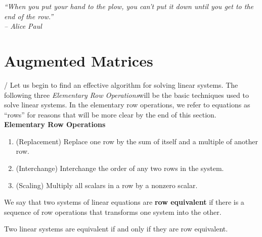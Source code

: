 \begin{center} 
\emph{``When you put your hand to the plow, you can't put it down until you get to the end of the row.''\\ -- Alice Paul}
\end{center}

\section{Augmented Matrices}\label{sec:aug}/%
Let us begin to find an effective algorithm for solving linear systems. The following three \emph{Elementary Row Operations}\footnotemark[2] will be the basic techniques used to solve linear systems. In the elementary row operations, we refer to equations as ``rows'' for reasons that will be more clear by the end of this section.\\

\label{def:rowoperations}\textbf{Elementary Row Operations}
\begin{enumerate}[label=\arabic*., series=!LIST!]
\item (Replacement) Replace one row by the sum of itself and a multiple of another row.\\
\item (Interchange) Interchange the order of any two rows in the system.\\
\item (Scaling) Multiply all scalars in a row by a nonzero scalar.
\end{enumerate}\vs

We say that two systems of linear equations are \textbf{row equivalent} if there is a sequence of row operations that transforms one system into the other.\\

\begin{Thm} Two linear systems are equivalent if and only if they are row equivalent.\end{Thm}\vs

